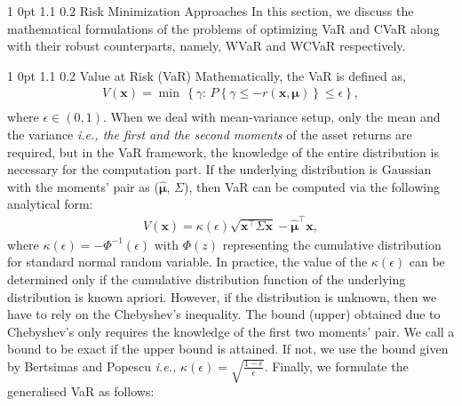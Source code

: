 \documentclass[12pt]{article}
\makeatletter
\numberwithin{equation}{section}
\renewcommand{\section}{
  \@startsection
  {section}%
  {1}%
  {0pt}%
  {1.1\baselineskip}%
  {0.2\baselineskip}%
  {\sc \centering}%
}
\renewcommand{\subsection}{
  \@startsection
  {subsection}%
  {1}%
  {0pt}%
  {1.1\baselineskip}%
  {0.2\baselineskip}%
  {\sc \centering}%
}
\makeatother
\begin{document}
\section{Risk Minimization Approaches}
\label{Risk_Minimization_Approaches}
In this section, we discuss the mathematical formulations of the problems of optimizing VaR and CVaR along with their robust counterparts, namely, WVaR and WCVaR respectively.
\subsection{Value at Risk (VaR)}
Mathematically, the VaR is defined as,
\begin{equation}
\begin{split}
V(\mathbf{x}) = \min \, \left\{ \gamma :  \, P\left\{\gamma \leq -r(\mathbf{x},\boldsymbol{\mu})\right\} \leq \epsilon \right\},  \\
\end{split}
\label{fig:var_basic}
\end{equation}
where $\epsilon \in (0,1)$. When we deal with mean-variance setup, only the mean and the variance \textit{i.e., the first and the second moments} of the asset returns are required, but in the VaR framework, the knowledge of the entire distribution is necessary for the computation part. If the underlying distribution is Gaussian with the moments' pair as ($\hat{\boldsymbol{\mu}}$, $\Sigma$), then VaR can be computed via the following analytical form:
\begin{equation}
\begin{split}
V(\mathbf{x}) = \kappa(\epsilon)\sqrt{\mathbf{x}^{\top}\Sigma \mathbf{x}} - \hat{\boldsymbol{\mu}}^{\top}\mathbf{x},
\end{split}
\label{eqn:kappa_eqn}
\end{equation}
where $\kappa(\epsilon) = -\Phi^{-1}(\epsilon)$ with $\Phi(z)$ representing the cumulative distribution for standard normal random variable. In practice, the value of the $\kappa(\epsilon)$ can be determined only if the cumulative distribution function of the underlying distribution is known apriori. However, if the distribution is unknown, then we have to rely on the Chebyshev's inequality. The bound (upper) obtained due to Chebyshev's only requires the knowledge of the first two moments' pair. We call a bound to be exact if the upper bound is attained. If not, we use the bound given by Bertsimas and Popescu \cite{bert05} \textit{i.e.,} $\displaystyle{ \kappa(\epsilon) = \sqrt{\frac{1-\epsilon}{\epsilon}}}$. Finally, we formulate the generalised VaR as follows:
\end{document}
